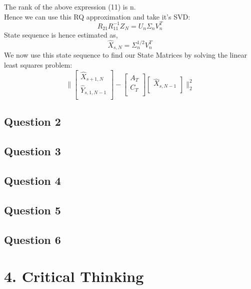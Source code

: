 \documentclass[12pt]{report}
\begin{document}
The rank of the above expression (11) is n.\\
Hence we can use this RQ approximation and take it's SVD:\\
\begin{equation*}
R_{21} R_{11}^{-1} Z_N = U_n \Sigma_n V_n^T
\end{equation*}
State sequence is hence estimated as,
\begin{equation*}
\hat{X}_{s,N} = \Sigma_n^{1/2} V_n^T
\end{equation*}
We now use this state sequence to find our State Matrices by solving the linear least squares problem:
\begin{equation*}
\|
\begin{bmatrix}
\hat{X}_{s+1,N}\\
\hat{Y}_{s,1,N-1}\\
\end{bmatrix}
- \begin{bmatrix}
A_T\\
C_T\\
\end{bmatrix}
\begin{bmatrix}
\hat{X}_{s,N-1}\\
\end{bmatrix}
\|_{2}^2
\end{equation*}
\subsection*{Question 2}


\subsection*{Question 3}

\subsection*{Question 4}

\subsection*{Question 5}

\subsection*{Question 6}


\section*{4. Critical Thinking}
\end{document}
